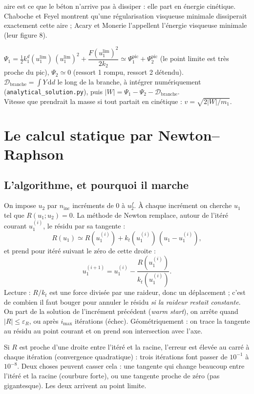 \documentclass[11pt,a4paper]{article}
\newcommand{\dd}{\mathrm{d}}
\newcommand{\kd}{k_1^{d}}
\newcommand{\imax}{i_{\max}}
\newcommand{\ninc}{n_{\text{inc}}}
\begin{document}
aire est ce que le béton n'arrive pas à dissiper : elle part en énergie cinétique. Chaboche et
Feyel montrent qu'une régularisation visqueuse minimale dissiperait exactement cette aire ;
Acary et Monerie l'appellent l'énergie visqueuse minimale (leur figure 8).
\begin{alamain}
$\Psi_1 = \tfrac12\kd(u_1^{\lim})\,(u_1^{\lim})^2 + \dfrac{F(u_1^{\lim})^2}{2k_2}
\simeq \Psi_1^{\text{pic}}+\Psi_2^{\text{pic}}$ (le point limite est très proche du pic), \quad
$\Psi_2 \simeq 0$ (ressort 1 rompu, ressort 2 détendu).\\
$\mathcal D_{\text{branche}} = \int Y\,\dd d$ le long de la branche, à intégrer numériquement
(\texttt{analytical\_solution.py}), puis $|W| = \Psi_1-\Psi_2-\mathcal D_{\text{branche}}$.\\
Vitesse que prendrait la masse si tout partait en cinétique : $v = \sqrt{2|W|/m_1}$.
\end{alamain}

\section{Le calcul statique par Newton--Raphson}

\subsection{L'algorithme, et pourquoi il marche}
On impose $u_2$ par $\ninc$ incréments de $0$ à $u_2^f$. À chaque incrément on cherche
$u_1$ tel que $R(u_1;u_2) = 0$. La méthode de Newton remplace, autour de l'itéré courant
$u_1^{(i)}$, le résidu par sa tangente :
\begin{equation}
  R(u_1) \simeq R(u_1^{(i)}) + k_t(u_1^{(i)})\,(u_1 - u_1^{(i)}),
\end{equation}
et prend pour itéré suivant le zéro de cette droite :
\begin{equation}
  u_1^{(i+1)} = u_1^{(i)} - \frac{R(u_1^{(i)})}{k_t(u_1^{(i)})}.
  \label{eq:newton}
\end{equation}
Lecture : $R/k_t$ est une force divisée par une raideur, donc un déplacement ; c'est de
combien il faut bouger pour annuler le résidu \emph{si la raideur restait constante}. On part
de la solution de l'incrément précédent (\emph{warm start}), on arrête quand $|R| \le \varepsilon_R$,
ou après $\imax$ itérations (échec). Géométriquement : on trace la tangente au résidu au point
courant et on prend son intersection avec l'axe.

Si $R$ est proche d'une droite entre l'itéré et la racine, l'erreur est élevée au carré à chaque
itération (convergence quadratique) : trois itérations font passer de $10^{-1}$ à $10^{-8}$.
Deux choses peuvent casser cela : une tangente qui change beaucoup entre l'itéré et la racine
(courbure forte), ou une tangente proche de zéro (pas gigantesque). Les deux arrivent au point
limite.
\end{document}
